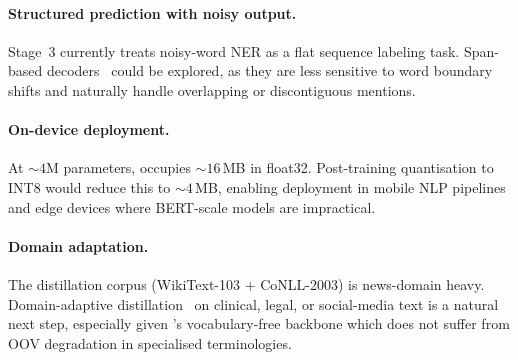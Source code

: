 \paragraph{Structured prediction with noisy output.}
Stage~3 currently treats noisy-word NER as a flat sequence labeling task.
Span-based decoders~\citep{joshi2020spanbert,shen2021locate} could be
explored, as they are less sensitive to word boundary shifts and naturally
handle overlapping or discontiguous mentions.

\paragraph{On-device deployment.}
At ${\sim}4$M parameters, \LightRet{} occupies ${\sim}16$\,MB in float32.
Post-training quantisation to INT8 would reduce this to ${\sim}4$\,MB,
enabling deployment in mobile NLP pipelines and edge devices where BERT-scale
models are impractical.

\paragraph{Domain adaptation.}
The distillation corpus (WikiText-103 + CoNLL-2003) is news-domain heavy.
Domain-adaptive distillation~\citep{xu2020bert} on clinical, legal, or
social-media text is a natural next step, especially given \LightRet{}'s
vocabulary-free backbone which does not suffer from OOV degradation in
specialised terminologies.
